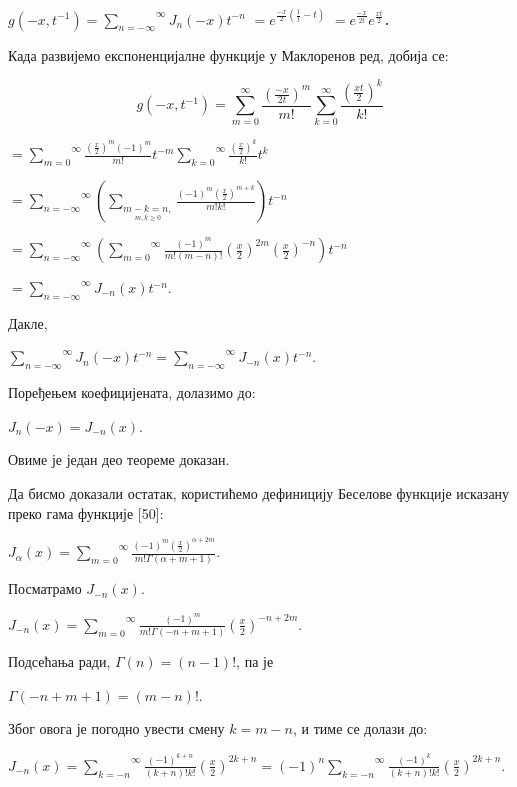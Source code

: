 \(g( - x,t^{- 1}) = \overset{\infty}{\sum_{n = - \infty}}J_{n}( - x)t^{- n}\)
\(= e^{\frac{- x}{2}(\frac{1}{t} - t)}\)
\(= e^{\frac{- x}{2t}}e^{\frac{xt}{2}}\)\emph{\textbf{.}}

Када развијемо експоненцијалне функције у Маклоренов ред, добија се:

\[g( - x,t^{- 1}) = \overset{\infty}{\sum_{m = 0}}\frac{\left( \frac{- x}{2t} \right)^{m}}{m!}\overset{\infty}{\sum_{k = 0}}\frac{\left( \frac{xt}{2} \right)^{k}}{k!}\]

\(= \overset{\infty}{\sum_{m = 0}}\frac{\left( \frac{x}{2} \right)^{m}{( - 1)}^{m}}{m!}t^{- m}\overset{\infty}{\sum_{k = 0}}\frac{\left( \frac{x}{2} \right)^{k}}{k!}t^{k}\)

\(= \overset{\infty}{\sum_{n = - \infty}}(\sum_{\underset{m,k \geq 0}{m - k = n,}}\frac{{( - 1)}^{m}\left( \frac{x}{2} \right)^{m + k}}{m!k!})t^{- n}\)

\(= \overset{\infty}{\sum_{n = - \infty}}(\overset{\infty}{\sum_{m = 0}}\frac{{( - 1)}^{m}}{m!(m - n)!}\left( \frac{x}{2} \right)^{2m}\left( \frac{x}{2} \right)^{- n})t^{- n}\)

\(= \overset{\infty}{\sum_{n = - \infty}}J_{- n}(x)t^{- n}\).

Дакле,

\(\overset{\infty}{\sum_{n = - \infty}}J_{n}( - x)t^{- n} = \overset{\infty}{\sum_{n = - \infty}}J_{- n}(x)t^{- n}\).

Поређењем коефицијената, долазимо до:

\(J_{n}( - x) = J_{- n}(x)\).

Овиме је један део теореме доказан.

Да бисмо доказали остатак, користићемо дефиницију Беселове функције
исказану преко гама функције {[}50{]}:

\(J_{\alpha}(x) = \overset{\infty}{\sum_{m = 0}}\frac{{( - 1)}^{m}\left( \frac{x}{2} \right)^{\alpha + 2m}}{m!\Gamma(\alpha + m + 1)}\).

Посматрамо \(J_{- n}(x)\).

\(J_{- n}(x) = \overset{\infty}{\sum_{m = 0}}\frac{{( - 1)}^{m}}{m!\Gamma( - n + m + 1)}\left( \frac{x}{2} \right)^{- n + 2m}\).

Подсећања ради, \(\Gamma(n) = (n - 1)!\), па је

\(\Gamma( - n + m + 1) = (m - n)!\).

Због овога је погодно увести смену \(k = m - n\), и тиме се долази до:

\(J_{- n}(x) = \overset{\infty}{\sum_{k = - n}}\frac{{( - 1)}^{k + n}}{(k + n)!k!}\left( \frac{x}{2} \right)^{2k + n} = {( - 1)}^{n}\overset{\infty}{\sum_{k = - n}}\frac{{( - 1)}^{k}}{(k + n)!k!}\left( \frac{x}{2} \right)^{2k + n}\).

